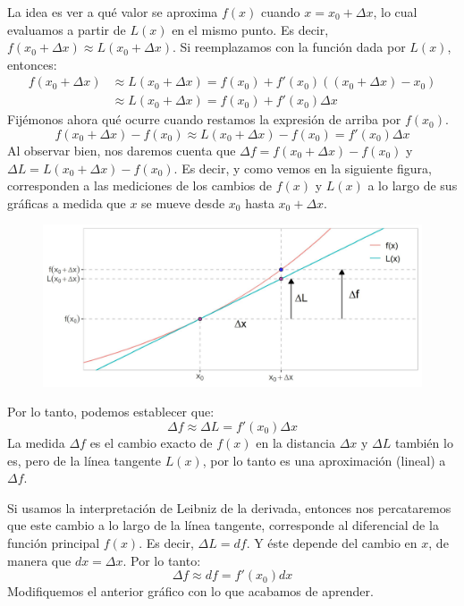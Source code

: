 \documentclass[12pt]{article}
\begin{document}
La idea es ver a qué valor se aproxima $f(x)$ cuando $x = x_{0} + \Delta x$, lo cual evaluamos a partir de $L(x)$ en el mismo punto. Es decir, $f(x_{0} + \Delta x) \approx L(x_{0} + \Delta x)$. Si reemplazamos con la función dada por $L(x)$, entonces:
\begin{align*}
  f(x_{0} + \Delta x) &\approx L(x_{0} + \Delta x) = f(x_{0}) + f'(x_{0})((x_{0} + \Delta x) - x_{0}) \\
                      &\approx L(x_{0} + \Delta x) = f(x_{0}) + f'(x_{0}) \Delta x
\end{align*}
Fijémonos ahora qué ocurre cuando restamos la expresión de arriba por $f(x_{0})$.
\[
  f(x_{0} + \Delta x) - f(x_{0}) \approx L(x_{0} + \Delta x) - f(x_{0}) = f'(x_{0}) \Delta x
\]
Al observar bien, nos daremos cuenta que $\Delta f = f(x_{0} + \Delta x) - f(x_{0})$ y $\Delta L = L(x_{0} + \Delta x) - f(x_{0})$. Es decir, y como vemos en la siguiente figura, corresponden a las mediciones de los cambios de $f(x)$ y $L(x)$ a lo largo de sus gráficas a medida que $x$ se mueve desde $x_{0}$ hasta $x_{0} + \Delta x$.

\begin{figure}[hbt!]
\centering
\includegraphics[scale=0.7]{img/diff_examp_plot_2.jpg}
\end{figure}

Por lo tanto, podemos establecer que:
\[
  \Delta f \approx \Delta L = f'(x_{0}) \Delta x
\]
La medida $\Delta f$ es el cambio exacto de $f(x)$ en la distancia $\Delta x$ y $\Delta L$ también lo es, pero de la línea tangente $L(x)$, por lo tanto es una aproximación (lineal) a $\Delta f$.

Si usamos la interpretación de Leibniz de la derivada, entonces nos percataremos que este cambio a lo largo de la línea tangente, corresponde al diferencial de la función principal $f(x)$. Es decir, $\Delta L = df$. Y éste depende del cambio en $x$, de manera que $dx = \Delta x$. Por lo tanto:
\[
  \Delta f \approx df = f'(x_{0}) dx
\]
Modifiquemos el anterior gráfico con lo que acabamos de aprender.
\end{document}
